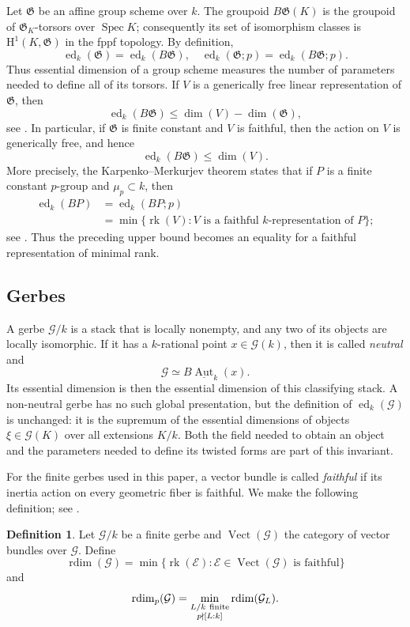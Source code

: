 \documentclass[11pt,reqno]{amsart}
\numberwithin{equation}{section}
\theoremstyle{plain}
\theoremstyle{definition}
\newtheorem{defi}[prop]{Definition}
\def\cG{{\mathcal G}}
\def\cE{{\mathcal E}}
\def\fG{{\mathfrak G}}
\def\rk{{\operatorname{rk}}}
\def\Spec{{\operatorname{Spec}}}
\def\Aut{{\operatorname{Aut}}}
\def\Vect{{\operatorname{Vect}}}
\def\rdim{{\operatorname{rdim}}}
\def\ed{{\operatorname{ed}}}
\def\H{{\mathrm H}}
\begin{document}
Let $\fG$ be an affine group scheme over $k$.  The groupoid
$B\fG(K)$ is the groupoid of $\fG_K$-torsors over $\Spec K$;
consequently its set of isomorphism classes is $\H^1(K,\fG)$ in the
fppf topology.  By definition,
\[
\ed_k(\fG)=\ed_k(B\fG),
\quad
\ed_k(\fG;p)=\ed_k(B\fG;p).
\]
Thus essential dimension of a group scheme measures the number of
parameters needed to define all of its torsors.  If $V$ is a generically
free linear representation of $\fG$, then
\[
\ed_k(B\fG)\le\dim(V)-\dim(\fG),
\]
see \cite[Lemma~4.11]{BerhuyFavi}.  In particular, if $\fG$ is finite constant
and $V$ is faithful, then the action on $V$ is generically free, and hence
\[
\ed_k(B\fG)\le\dim(V).
\]
More precisely, the Karpenko--Merkurjev theorem states that if $P$ is a
finite constant $p$-group and $\mu_p\subset k$, then
\[
\begin{aligned}
\ed_k(BP)&=\ed_k(BP;p)\\
&=\min\{\rk(V): V\text{ is a faithful $k$-representation of }P\};
\end{aligned}
\]
see \cite[Theorem~4.1]{KM}. Thus the preceding
upper bound becomes an equality for a faithful representation of minimal
rank.

\subsection{Gerbes}

A gerbe $\cG/k$ is a stack that is locally nonempty, and any two of its objects are
locally isomorphic.  If it has a $k$-rational point $x\in\cG(k)$, then it is called
\emph{neutral} and
\[
\cG\simeq B\underline{\Aut}_k(x).
\]
Its essential dimension is then the essential dimension of this
classifying stack.  A non-neutral gerbe has no such global presentation,
but the definition of $\ed_k(\cG)$ is unchanged: it is the supremum of
the essential dimensions of objects $\xi\in\cG(K)$ over all extensions
$K/k$.  Both the field needed to obtain an object and the parameters
needed to define its twisted forms are part of this invariant.

For the finite gerbes used in this paper, a vector bundle is called
\emph{faithful} if its inertia action on every geometric fiber is faithful.
We make the following definition; see \cite[Definition~3.0.4]{BraggLieblich}.

\begin{defi} Let $\cG/k$ be a finite gerbe and $\Vect(\cG)$ the category of vector bundles over $\cG$. Define
    \[
\rdim(\cG)=
\min\{\rk(\cE):\cE\in\Vect(\cG)
       \text{ is faithful}\}
\]
and
\[
\rdim_p(\cG)=
\min_{\substack{L/k\ {\rm finite}\\p\nmid[L:k]}}\rdim(\cG_L).
\]
\end{defi}
\end{document}
